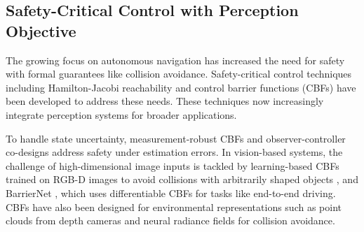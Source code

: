 


\subsection{Safety-Critical Control with Perception Objective}


The growing focus on autonomous navigation has increased the need for safety with formal guarantees like collision avoidance. Safety-critical control techniques including Hamilton-Jacobi reachability and control barrier functions (CBFs) have been developed to address these needs. These techniques now increasingly integrate perception systems for broader applications.

To handle state uncertainty, measurement-robust CBFs \cite{cosner2021measurement} and observer-controller co-designs \cite{agrawal2022safe} address safety under estimation errors. In vision-based systems, the challenge of high-dimensional image inputs is tackled by learning-based CBFs trained on RGB-D images to avoid collisions with arbitrarily shaped objects \cite{abdi2023safe}, and BarrierNet \cite{xiao2023barriernet}, which uses differentiable CBFs for tasks like end-to-end driving. CBFs have also been designed for environmental representations such as point clouds from depth cameras \cite{de2024point} and neural radiance fields \cite{tong2023enforcing} for collision avoidance.

